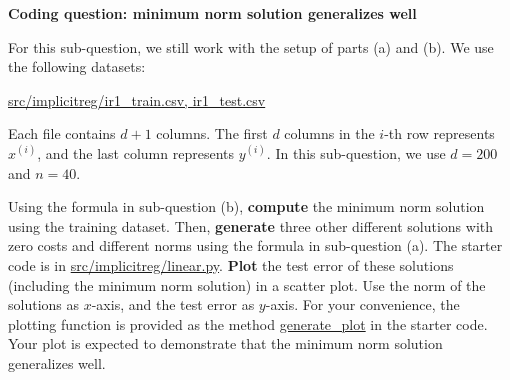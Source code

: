 \item{} 
\textbf{Coding question: minimum norm solution generalizes well}

For this sub-question, we still work with the setup of parts (a) and (b). We use the following datasets:
\begin{center}
	\url{src/implicitreg/ir1_train.csv, ir1_test.csv}
\end{center}
Each file contains $d+1$ columns. The first $d$ columns in the $i$-th row represents $x^{(i)}$, and the last column represents $y^{(i)}.$ In this sub-question, we use $d=200$ and $n=40$.

Using the formula in sub-question (b), \textbf{compute} the minimum norm solution using the training dataset. Then, \textbf{generate} three other different solutions with zero costs and different norms using the formula in sub-question (a).
The starter code is in \url{src/implicitreg/linear.py}. \textbf{Plot} the test error of these solutions (including the minimum norm solution) in a scatter plot. 
Use the norm of the solutions as $x$-axis, and the test error as $y$-axis. For your convenience, the plotting function is provided as the method \url{generate_plot} in the starter code. 
Your plot is expected to demonstrate that the minimum norm solution generalizes well.